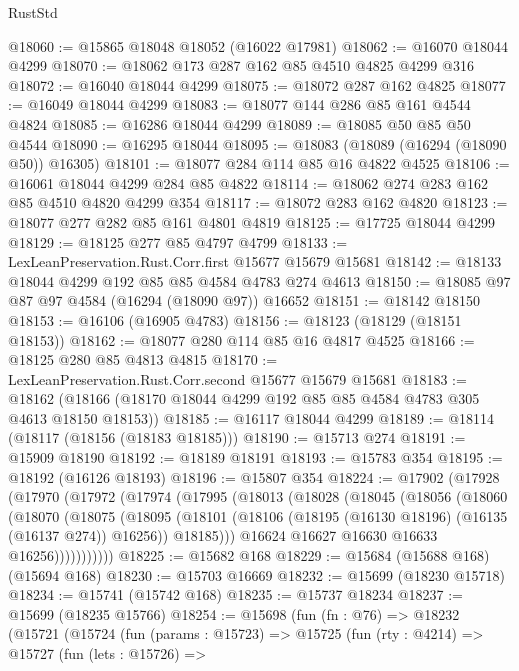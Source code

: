 \begin{lexlean}{RustStd}
\begin{coremodule}
@18060 := @15865 @18048 @18052 (@16022 @17981)
@18062 := @16070 @18044 @4299
@18070 := @18062 @173 @287 @162 @85 @4510 @4825 @4299 @316
@18072 := @16040 @18044 @4299
@18075 := @18072 @287 @162 @4825
@18077 := @16049 @18044 @4299
@18083 := @18077 @144 @286 @85 @161 @4544 @4824
@18085 := @16286 @18044 @4299
@18089 := @18085 @50 @85 @50 @4544
@18090 := @16295 @18044
@18095 := @18083 (@18089 (@16294 (@18090 @50)) @16305)
@18101 := @18077 @284 @114 @85 @16 @4822 @4525
@18106 := @16061 @18044 @4299 @284 @85 @4822
@18114 := @18062 @274 @283 @162 @85 @4510 @4820 @4299 @354
@18117 := @18072 @283 @162 @4820
@18123 := @18077 @277 @282 @85 @161 @4801 @4819
@18125 := @17725 @18044 @4299
@18129 := @18125 @277 @85 @4797 @4799
@18133 := LexLeanPreservation.Rust.Corr.first @15677 @15679 @15681
@18142 := @18133 @18044 @4299 @192 @85 @85 @4584 @4783 @274 @4613
@18150 := @18085 @97 @87 @97 @4584 (@16294 (@18090 @97)) @16652
@18151 := @18142 @18150
@18153 := @16106 (@16905 @4783)
@18156 := @18123 (@18129 (@18151 @18153))
@18162 := @18077 @280 @114 @85 @16 @4817 @4525
@18166 := @18125 @280 @85 @4813 @4815
@18170 := LexLeanPreservation.Rust.Corr.second @15677 @15679 @15681
@18183 := @18162 (@18166 (@18170 @18044 @4299 @192 @85 @85 @4584 @4783 @305 @4613 @18150 @18153))
@18185 := @16117 @18044 @4299
@18189 := @18114 (@18117 (@18156 (@18183 @18185)))
@18190 := @15713 @274
@18191 := @15909 @18190
@18192 := @18189 @18191
@18193 := @15783 @354
@18195 := @18192 (@16126 @18193)
@18196 := @15807 @354
@18224 := @17902
    (@17928
      (@17970
        (@17972
          (@17974
            (@17995
              (@18013
                (@18028
                  (@18045
                    (@18056
                      (@18060
                        (@18070
                          (@18075
                            (@18095
                              (@18101
                                (@18106 (@18195 (@16130 @18196) (@16135 (@16137 @274)) @16256))
                                @18185)))
                          @16624
                          @16627
                          @16630
                          @16633
                          @16256)))))))))))
@18225 := @15682 @168
@18229 := @15684 (@15688 @168) (@15694 @168)
@18230 := @15703 @16669
@18232 := @15699 (@18230 @15718)
@18234 := @15741 (@15742 @168)
@18235 := @15737 @18234
@18237 := @15699 (@18235 @15766)
@18254 := @15698
    (fun (fn : @76) =>
    @18232
      (@15721
        (@15724
          (fun (params : @15723) =>
          @15725
            (fun (rty : @4214) =>
            @15727
              (fun (lets : @15726) =>

\end{coremodule}
\end{lexlean}
